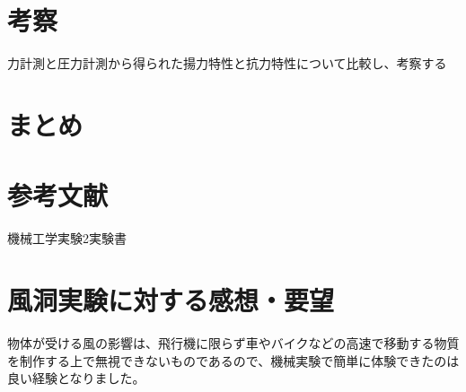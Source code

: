 \documentclass[a4j,twoside,openright,11pt]{jarticle}
\begin{document}
\newpage
\section{考察}
力計測と圧力計測から得られた揚力特性と抗力特性について比較し、考察する

\section{まとめ}
\section{参考文献}
機械工学実験2実験書
\section{風洞実験に対する感想・要望}
物体が受ける風の影響は、飛行機に限らず車やバイクなどの高速で移動する物質を制作する上で無視できないものであるので、機械実験で簡単に体験できたのは良い経験となりました。
\end{document}
